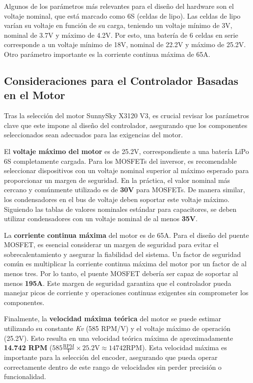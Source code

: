 \documentclass[11pt]{report}
\begin{document}
Algunos de los parámetros más relevantes para el diseño del hardware son el voltaje nominal, que está marcado como 6S (celdas de lipo). Las celdas de lipo varían su voltaje en función de su carga, teniendo un voltaje mínimo de 3V, nominal de 3.7V y máximo de 4.2V. Por esto, una batería de 6 celdas en serie corresponde a un voltaje mínimo de 18V, nominal de 22.2V y máximo de 25.2V. Otro parámetro importante es la corriente continua máxima de 65A.

\newpage
\subsection{Consideraciones para el Controlador Basadas en el Motor}

Tras la selección del motor SunnySky X3120 V3, es crucial revisar los parámetros clave que este impone al diseño del controlador, asegurando que los componentes seleccionados sean adecuados para las exigencias del motor.

El \textbf{voltaje máximo del motor} es de 25.2V, correspondiente a una batería LiPo 6S completamente cargada. Para los MOSFETs del inversor, es recomendable seleccionar dispositivos con un voltaje nominal superior al máximo esperado para proporcionar un margen de seguridad. En la práctica, el valor nominal más cercano y comúnmente utilizado es de \textbf{30V} para MOSFETs. De manera similar, los condensadores en el bus de voltaje deben soportar este voltaje máximo. Siguiendo las tablas de valores nominales estándar para capacitores, se deben utilizar condensadores con un voltaje nominal de al menos \textbf{35V}.

La \textbf{corriente continua máxima} del motor es de 65A. Para el diseño del puente MOSFET, es esencial considerar un margen de seguridad para evitar el sobrecalentamiento y asegurar la fiabilidad del sistema.  Un factor de seguridad común es multiplicar la corriente continua máxima del motor por un factor de al menos tres. Por lo tanto, el puente MOSFET debería ser capaz de soportar al menos \textbf{195A}. Este margen de seguridad garantiza que el controlador pueda manejar picos de corriente y operaciones continuas exigentes sin comprometer los componentes.

Finalmente, la \textbf{velocidad máxima teórica} del motor se puede estimar utilizando su constante \emph{Kv} (585 RPM/V) y el voltaje máximo de operación (25.2V).  Esto resulta en una velocidad teórica máxima de aproximadamente \textbf{14.742 RPM} (\(585 \frac{\text{RPM}}{V} \times 25.2 \text{V} \approx 14742 \text{RPM}\)). Esta velocidad máxima es importante para la selección del encoder, asegurando que pueda operar correctamente dentro de este rango de velocidades sin perder precisión o funcionalidad.
\end{document}
